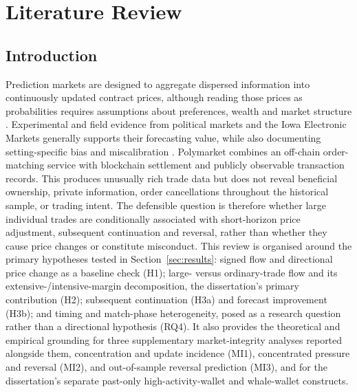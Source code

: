 
\section{Literature Review}
\label{sec:literature-review}

\subsection{Introduction}
\label{lr:introduction}

Prediction markets are designed to aggregate dispersed information into continuously updated contract prices, although reading those prices as probabilities requires assumptions about preferences, wealth and market structure \citep{hayek1945knowledge,wolferszitzewitz2004prediction,manski2006interpreting}. Experimental and field evidence from political markets and the Iowa Electronic Markets generally supports their forecasting value, while also documenting setting-specific bias and miscalibration \citep{forsythe1992anatomy,berg2008dozen,arrow2008promise}. Polymarket combines an off-chain order-matching service with blockchain settlement and publicly observable transaction records. This produces unusually rich trade data but does not reveal beneficial ownership, private information, order cancellations throughout the historical sample, or trading intent. The defensible question is therefore whether large individual trades are conditionally associated with short-horizon price adjustment, subsequent continuation and reversal, rather than whether they cause price changes or constitute misconduct. This review is organised around the primary hypotheses tested in Section~\ref{sec:results}: signed flow and directional price change as a baseline check (H1); large- versus ordinary-trade flow and its extensive-/intensive-margin decomposition, the dissertation's primary contribution (H2); subsequent continuation (H3a) and forecast improvement (H3b); and timing and match-phase heterogeneity, posed as a research question rather than a directional hypothesis (RQ4). It also provides the theoretical and empirical grounding for three supplementary market-integrity analyses reported alongside them, concentration and update incidence (MI1), concentrated pressure and reversal (MI2), and out-of-sample reversal prediction (MI3), and for the dissertation's separate past-only high-activity-wallet and whale-wallet constructs.

